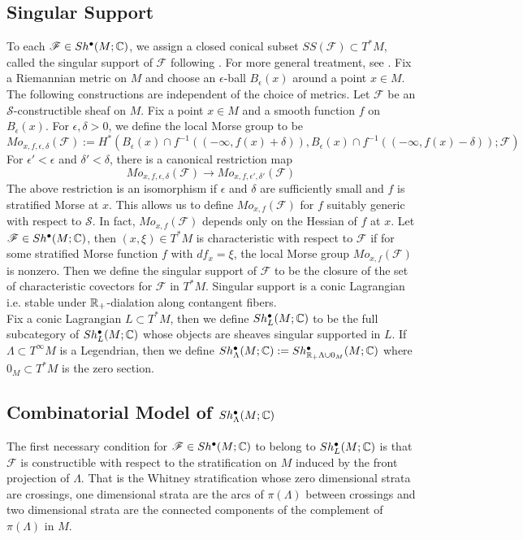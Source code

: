\subsection*{Singular Support}
To each $\mathscr{F}\in Sh^\bullet (M;\mathbb{C})$, we assign a closed conical subset $SS(\mathscr{F})\subset T^*M$, called the singular support of $\mathscr{F}$ following \cite{goresky1983stratified}\cite{schurmann2012topology}\cite{shende2017legendrian}. For more general treatment, see \cite{kashiwara2013sheaves}. Fix a Riemannian metric on $M$ and choose an $\epsilon$-ball $B_\epsilon(x)$ around a point $x\in M$. The following constructions are independent of the choice of metrics. Let $\mathscr{F}$ be an $\mathcal{S}$-constructible sheaf on $M$. Fix a point $x\in M$ and a smooth function $f$ on $B_\epsilon(x)$. For $\epsilon,\delta >0$, we define the local Morse group to be
\[
Mo_{x,f,\epsilon,\delta}(\mathscr{F}) := H^*(B_\epsilon(x)\cap f^{-1}((-\infty,f(x)+\delta)),B_\epsilon(x)\cap f^{-1}((-\infty,f(x)-\delta));\mathscr{F})
\]
For $\epsilon' < \epsilon$ and $\delta' < \delta$, there is a canonical restriction map
\[
Mo_{x,f,\epsilon,\delta}(\mathscr{F})\rightarrow Mo_{x,f,\epsilon',\delta'}(\mathscr{F})
\]
The above restriction is an isomorphism if $\epsilon$ and $\delta$ are sufficiently small and $f$ is stratified Morse at $x$. This allows us to define $Mo_{x,f}(\mathscr{F})$ for $f$ suitably generic with respect to $\mathcal{S}$\cite[Prop.~7.5.3]{kashiwara2013sheaves}. In fact, $Mo_{x,f} (\mathscr{F})$ depends only on the Hessian of $f$ at $x$.
Let $\mathscr{F}\in Sh^\bullet (M;\mathbb{C})$, then $(x,\xi)\in T^*M$ is characteristic with respect to $\mathscr{F}$ if for some stratified Morse function $f$ with $df_x = \xi$, the local Morse group $Mo_{x,f}(\mathscr{F})$ is nonzero. Then we define the singular support of $\mathscr{F}$ to be the closure of the set of characteristic covectors for $\mathscr{F}$ in $T^*M$. Singular support is a conic Lagrangian i.e. stable under $\mathbb{R}_+$-dialation along contangent fibers.\\
Fix a conic Lagrangian $L\subset T^*M$, then we define $Sh^\bullet_L(M;\mathbb{C})$ to be the full subcategory of $Sh^\bullet_L(M;\mathbb{C})$ whose objects are sheaves singular supported in $L$. If $\Lambda\subset T^\infty M$ is a Legendrian, then we define $Sh^\bullet_\Lambda(M;\mathbb{C}) := Sh^\bullet_{\mathbb{R}_+ \Lambda \cup 0_M}(M;\mathbb{C})$ where $0_M \subset T^*M$ is the zero section.

\subsection*{Combinatorial Model of $Sh^\bullet_\Lambda(M;\mathbb{C})$}
The first necessary condition for $\mathscr{F}\in Sh^\bullet(M;\mathbb{C})$ to belong to $Sh^\bullet_L(M;\mathbb{C})$ is that $\mathscr{F}$ is constructible with respect to the stratification on $M$ induced by the front projection of $\Lambda$. That is the Whitney stratification whose zero dimensional strata are crossings, one dimensional strata are the arcs of $\pi(\Lambda)$ between crossings and two dimensional strata are the connected components of the complement of $\pi(\Lambda)$ in $M$.

